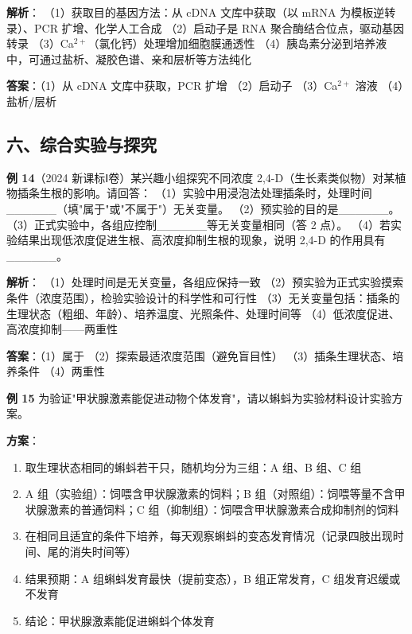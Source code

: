 \textbf{解析}：
（1）获取目的基因方法：从 cDNA 文库中获取（以 mRNA 为模板逆转录）、PCR 扩增、化学人工合成
（2）启动子是 RNA 聚合酶结合位点，驱动基因转录
（3）Ca$^{2+}$（氯化钙）处理增加细胞膜通透性
（4）胰岛素分泌到培养液中，可通过盐析、凝胶色谱、亲和层析等方法纯化

\textbf{答案}：（1）从 cDNA 文库中获取，PCR 扩增 （2）启动子 （3）Ca$^{2+}$ 溶液 （4）盐析/层析

\subsection{六、综合实验与探究}

\textbf{例 14}（2024 新课标Ⅰ卷）某兴趣小组探究不同浓度 2,4-D（生长素类似物）对某植物插条生根的影响。请回答：
（1）实验中用浸泡法处理插条时，处理时间\_\_\_\_\_\_（填"属于"或"不属于"）无关变量。
（2）预实验的目的是\_\_\_\_\_\_。
（3）正式实验中，各组应控制\_\_\_\_\_\_等无关变量相同（答 2 点）。
（4）若实验结果出现低浓度促进生根、高浓度抑制生根的现象，说明 2,4-D 的作用具有\_\_\_\_\_\_。

\textbf{解析}：
（1）处理时间是无关变量，各组应保持一致
（2）预实验为正式实验摸索条件（浓度范围），检验实验设计的科学性和可行性
（3）无关变量包括：插条的生理状态（粗细、年龄）、培养温度、光照条件、处理时间等
（4）低浓度促进、高浓度抑制——两重性

\textbf{答案}：（1）属于 （2）探索最适浓度范围（避免盲目性） （3）插条生理状态、培养条件 （4）两重性

\textbf{例 15} 为验证"甲状腺激素能促进动物个体发育"，请以蝌蚪为实验材料设计实验方案。

\textbf{方案}：
\begin{enumerate}
  \item 取生理状态相同的蝌蚪若干只，随机均分为三组：A 组、B 组、C 组
  \item A 组（实验组）：饲喂含甲状腺激素的饲料；B 组（对照组）：饲喂等量不含甲状腺激素的普通饲料；C 组（抑制组）：饲喂含甲状腺激素合成抑制剂的饲料
  \item 在相同且适宜的条件下培养，每天观察蝌蚪的变态发育情况（记录四肢出现时间、尾的消失时间等）
  \item 结果预期：A 组蝌蚪发育最快（提前变态），B 组正常发育，C 组发育迟缓或不发育
  \item 结论：甲状腺激素能促进蝌蚪个体发育
\end{enumerate}
